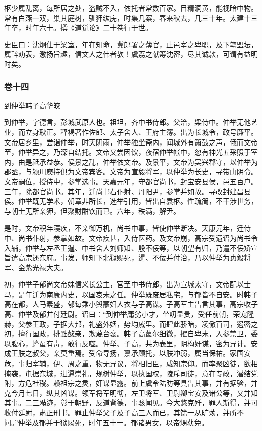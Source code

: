 \documentclass[]{article}
\begin{document}
枢少属乱离，每所居之处，盗贼不入，依托者常数百家。目精洞黄，能视暗中物。常有白燕一双，巢其庭树，驯狎纮庑，时集几案，春来秋去，几三十年。太建十三年卒，时年六十。撰《道觉论》二十卷行于世。

史臣曰：沈炯仕于梁室，年在知命，冀郎署之薄官，止邑宰之卑职，及下笔盟坛，属辞劝表，激扬旨趣，信文人之伟者欤！虞荔之献筹沈密，尽其诚款，可谓有益明时矣。

\hypertarget{header-n4619}{%
\subsubsection{卷十四}\label{header-n4619}}

到仲举韩子高华皎

到仲举，字德言，彭城武原人也。祖坦，齐中书侍郎。父洽，梁侍中。仲举无他艺业，而立身耿正。释褐著作佐郎、太子舍人、王府主簿。出为长城令，政号廉平。文帝居乡里，尝诣仲举，时天阴雨，仲举独坐斋内，闻城外有箫鼓之声，俄而文帝至，仲举异之，乃深自结托。文帝又尝因饮，夜宿仲举帐中，忽有神光五采照于室内，由是祗承益恭。侯景之乱，仲举依文帝。及景平，文帝为吴兴郡守，以仲举为郡丞，与颍川庾持俱为文帝宾客。文帝为宣毅将军，以仲举为长史，寻带山阴令。文帝嗣位，授侍中，参掌选事。天嘉元年，守都官尚书，封宝安县侯，邑五百户。三年，除都官尚书。其年，迁尚书右仆射、丹阳尹，参掌并如故。寻改封建昌县侯。仲举既无学术，朝章非所长，选举引用，皆出自袁枢。性疏简，不干涉世务，与朝士无所亲狎，但聚财酣饮而已。六年，秩满，解尹。

是时，文帝积年寝疾，不亲御万机，尚书中事，皆使仲举断决。天康元年，迁侍中、尚书仆射，参掌如故。文帝疾甚，入侍医药。及文帝崩，高宗受遗诏为尚书令入辅，仲举与左丞王暹、中书舍人刘师知、殷不佞等，以朝望有归，乃遣不佞矫宣旨遣高宗还东府。事发，师知下北狱赐死，暹、不佞并付治，乃以仲举为贞毅将军、金紫光禄大夫。

初，仲举子郁尚文帝妹信义长公主，官至中书侍郎，出为宣城太守，文帝配以士马，是年迁为南康内史，以国哀未之任。仲举既废居私宅，与郁皆不自安。时韩子高在都，人马素盛，郁每乘小舆蒙妇人衣与子高谋。子高军主告言其事，高宗收子高、仲举及郁并付廷尉。诏曰：``到仲举庸劣小才，坐叨显贵，受任前朝，荣宠隆赫，父参王政，子据大邦，礼盛外姻，势均戚里。而肆此骄暗，凌傲百司，遏密之初，擅行国政，排黜懿亲，欺蔑台衮。韩子高蕞尔细微，擢自卑末，入参禁卫，委以腹心，蜂虿有毒，敢行反噬。仲举、子高，共为表里，阴构奸谋，密为异计。安成王朕之叔父，亲莫重焉。受命导扬，禀承顾托，以朕冲弱，属当保祐。家国安危，事归宰辅，伊、周之重，物无异议，将相旧臣，咸知宗仰。而率聚凶徒，欲相掩袭，屯据东城，进逼崇礼，规树仲举，以执国权，陵斥司徒，意在专政，潜结党附，方危社稷。赖祖宗之灵，奸谋显露。前上虞令陆昉等具告其事，并有据验，并克今月七日，纵其凶谋。领军将军明彻，左卫将军、卫尉卿宝安及诸公等，又并知其事。二三飐迹，彰于朝野，反道背德，事骇闻见。今大憝克歼，罪人斯得，并可收付廷尉，肃正刑书。罪止仲举父子及子高三人而已，其馀一从旷荡，并所不问。''仲举及郁并于狱赐死，时年五十一。郁诸男女，以帝甥获免。
\end{document}
